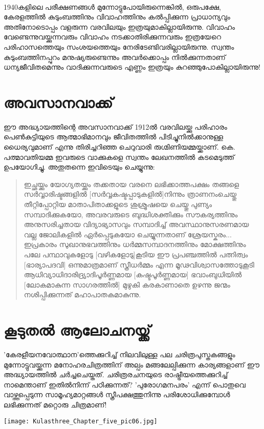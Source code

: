 \paragraph{}1940കളിലെ പരീക്ഷണങ്ങൾ മുന്നോട്ടുപോയിരുന്നെങ്കിൽ, ഒരുപക്ഷേ, കേരളത്തിൽ കുടുംബത്തിനും വിവാഹത്തിനും കൽപ്പിക്കുന്ന പ്രാധാന്യവും അതിനോടൊപ്പം വളരുന്ന വരവിലയും ഇത്രയുമാകില്ലായിരുന്നു. വിവാഹം വേണ്ടെന്നുവയ്ക്കുന്നവരും വിവാഹം നടക്കാതിരിക്കുന്നവരും ഇത്രയേറെ പരിഹാസത്തെയും സംശയത്തെയും നേരിടേണ്ടിവരില്ലായിരുന്നു. സ്വന്തം കുടുംബത്തിനപ്പുറം മനുഷ്യരുണ്ടെന്നും അവർക്കൊപ്പം നിൽക്കുന്നതാണ് ധന്യജീവിതമെന്നും വാദിക്കുന്നവരുടെ എണ്ണം ഇത്രയും കുറഞ്ഞുപോകില്ലായിരുന്നു!



\section{അവസാനവാക്ക്}
\label{ch5sec4}
ഈ അദ്ധ്യായത്തിന്റെ അവസാനവാക്ക് 1912ൽ വരവിലയ്ക്കു പരിഹാരം പെൺകുട്ടിയുടെ ആത്മാഭിമാനവും ജീവിതത്തിൽ പിടിച്ചുനിൽക്കാനുള്ള ധൈര്യവുമാണ് എന്നു തിരിച്ചറിഞ്ഞ ചെറുവാരി രുഗ്മിണിയമ്മയ്ക്കാണ്. കെ. പത്മാവതിയമ്മ ഇവരുടെ വാക്കുകളെ സ്വന്തം ലേഖനത്തിൽ കടമെടുത്ത് ഉപയോഗിച്ചു. അതുതന്നെ ഇവിടെയും ചെയ്യുന്നു:
\begin{quotation}
ഇച്ഛയ്ക്കും യോഗ്യതയ്ക്കും തക്കതായ വരനെ ലഭിക്കാത്തപക്ഷം തങ്ങളെ സർവ്വാരിഷ്ടങ്ങളിൽ [സർവ്വകഷ്ടപ്പാടുകളിൽ]നിന്നും ത്രാണനംചെയ്തു തീറ്റിപ്പോറ്റിയ മാതാപിതാക്കളുടെ ശുശ്രൂഷയെ ചെയ്തു പുണ്യം സമ്പാദിക്കുകയോ, അവരവരുടെ ബുദ്ധിശക്തിക്കും സൗകര്യത്തിനും അനുസരിച്ചതായ വിദ്യാഭ്യാസവും സമ്പാദിച്ച് അവസ്ഥാനുസരണമായ വല്ല ജോലികളിൽ ഏർപ്പെടുകയോ ചെയ്യുന്നതാണ് ശ്രേയസ്കരം... ഇപ്രകാരം സുഖാനുഭവത്തിനും ധർമ്മസമ്പാദനത്തിനും മോക്ഷത്തിനും പലേ പന്ഥാവുകളോടു [വഴികളോടു]കൂടിയ ഈ പ്രപഞ്ചത്തിൽ പത്നിത്വം [ഭാര്യാപദവി] ഒന്നുമാത്രമാണ് സ്ത്രീധർമ്മം എന്ന മൂഢവിശ്വാസത്തോടുകൂടി ആധിവ്യാധിദാരിദ്ര്യാദിപൂർണ്ണമായ [കഷ്ടപൂർണ്ണമായ] ഭവാംബുധിയിൽ [ലോകമാകുന്ന സാഗരത്തിൽ] മുഴുകി കരകാണാതെ ഉഴന്നു ജന്മം നശിപ്പിക്കുന്നത് മഹാപാതകമാകുന്നു.

\end{quotation}

\section{കൂടുതൽ ആലോചനയ്ക്ക്}
\label{ch5sec5}
'കേരളീയനവോത്ഥാന'ത്തെക്കുറിച്ച് നിലവിലുള്ള പല ചരിത്രപുസ്തകങ്ങളും മുന്നോട്ടുവയ്ക്കുന്ന മനോഹരചിത്രത്തിന് അല്പം മങ്ങലേല്പിക്കുന്ന കാര്യങ്ങളാണ് ഈ അദ്ധ്യായത്തിൽ ചർച്ചചെയ്തത്. ചരിത്രരചനയുടെ രാഷ്ട്രീയത്തെക്കുറിച്ച് നാമെന്താണ് ഇതിൽനിന്ന് പഠിക്കുന്നത്? 'പുരോഗമനപരം' എന്ന് പൊതുവെ വാഴ്ത്തപ്പെടുന്ന സാമൂഹ്യമാറ്റങ്ങൾ സ്ത്രീപക്ഷത്തുനിന്നു പരിശോധിക്കുമ്പോൾ ലഭിക്കുന്നത് മറ്റൊരു ചിത്രമാണ്! 

\begin{center}
\texttt{[image: Kulasthree\_Chapter\_five\_pic06.jpg]}
\end{center}
